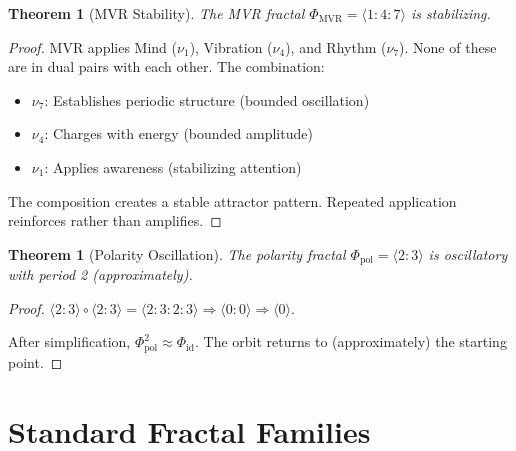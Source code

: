 \documentclass[11pt,twoside,openright]{book}
\theoremstyle{definition}
\theoremstyle{plain}
\newtheorem{theorem}[definition]{Theorem}
\theoremstyle{remark}
\newcommand{\noe}[1]{\nu_{#1}}
\newcommand{\Frac}{\Phi}
\newcommand{\id}{\mathrm{id}}
\begin{document}
\begin{theorem}[MVR Stability]
\label{thm:mvr-stability}
The MVR fractal $\Frac_{\text{MVR}} = \langle 1 : 4 : 7 \rangle$ is stabilizing.
\end{theorem}

\begin{proof}
MVR applies Mind ($\noe{1}$), Vibration ($\noe{4}$), and Rhythm ($\noe{7}$). None of these are in dual pairs with each other. The combination:
\begin{itemize}
\item $\noe{7}$: Establishes periodic structure (bounded oscillation)
\item $\noe{4}$: Charges with energy (bounded amplitude)
\item $\noe{1}$: Applies awareness (stabilizing attention)
\end{itemize}
The composition creates a stable attractor pattern. Repeated application reinforces rather than amplifies.
\end{proof}

\begin{theorem}[Polarity Oscillation]
\label{thm:polarity-oscillation}
The polarity fractal $\Frac_{\text{pol}} = \langle 2 : 3 \rangle$ is oscillatory with period 2 (approximately).
\end{theorem}

\begin{proof}
$\langle 2 : 3 \rangle \circ \langle 2 : 3 \rangle = \langle 2 : 3 : 2 : 3 \rangle \Rightarrow \langle 0 : 0 \rangle \Rightarrow \langle 0 \rangle$.

After simplification, $\Frac_{\text{pol}}^2 \approx \Frac_{\id}$. The orbit returns to (approximately) the starting point.
\end{proof}

\section{Standard Fractal Families}
\end{document}
